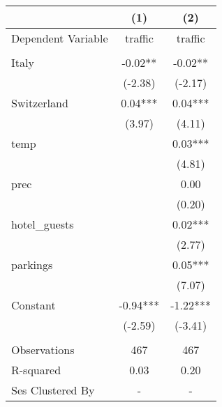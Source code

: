 \begin{tabular}{lcc}
\toprule
{} &       (1) &       (2) \\
\midrule
Dependent Variable &   traffic &   traffic \\
                   &           &           \\
Italy              &   -0.02** &   -0.02** \\
                   &   (-2.38) &   (-2.17) \\
Switzerland        &   0.04*** &   0.04*** \\
                   &    (3.97) &    (4.11) \\
temp               &           &   0.03*** \\
                   &           &    (4.81) \\
prec               &           &      0.00 \\
                   &           &    (0.20) \\
hotel\_guests       &           &   0.02*** \\
                   &           &    (2.77) \\
parkings           &           &   0.05*** \\
                   &           &    (7.07) \\
Constant           &  -0.94*** &  -1.22*** \\
                   &   (-2.59) &   (-3.41) \\
                   &           &           \\
Observations       &       467 &       467 \\
R-squared          &      0.03 &      0.20 \\
Ses Clustered By   &         - &         - \\
\bottomrule
\end{tabular}
